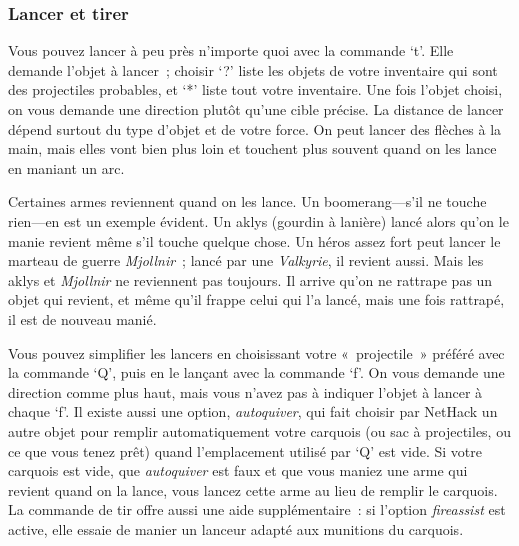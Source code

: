 \documentclass[titlepage]{article}
\begin{document}
\subsubsection{Lancer et tirer}



Vous pouvez lancer à peu près n'importe quoi avec la commande `t'.
Elle demande l'objet à lancer~; choisir `?' liste les objets de votre
inventaire qui sont des projectiles probables, et `*' liste tout
votre inventaire.
Une fois l'objet choisi, on vous demande une direction plutôt qu'une cible
précise.
La distance de lancer dépend surtout du type d'objet et de votre force.
On peut lancer des flèches à la main, mais elles vont bien plus loin et
touchent plus souvent quand on les lance en maniant un arc.


Certaines armes reviennent quand on les lance.
Un boomerang---s'il ne touche rien---en est un exemple évident.
Un aklys (gourdin à lanière) lancé alors qu'on le manie revient même s'il
touche quelque chose.
Un héros assez fort peut lancer le marteau de guerre \textit{Mjollnir}~;
lancé par une \textit{Valkyrie}, il revient aussi.
Mais les aklys et \textit{Mjollnir} ne reviennent pas toujours.
Il arrive qu'on ne rattrape pas un objet qui revient, et même qu'il
frappe celui qui l'a lancé, mais une fois rattrapé, il est de nouveau
manié.


Vous pouvez simplifier les lancers en choisissant votre «~projectile~»
préféré avec la commande `Q', puis en le lançant avec la commande
`f'.
On vous demande une direction comme plus haut, mais vous n'avez pas à
indiquer l'objet à lancer à chaque `f'.
Il existe aussi une option,
\textit{autoquiver},
qui fait choisir par NetHack un autre objet pour remplir automatiquement
votre carquois (ou sac à projectiles, ou ce que vous tenez prêt) quand
l'emplacement utilisé par `Q' est vide.
Si votre carquois est vide, que
\textit{autoquiver}
est faux et que vous maniez une arme qui revient quand on la lance, vous
lancez cette arme au lieu de remplir le carquois.
La commande de tir offre aussi une aide supplémentaire~: si l'option
\textit{fireassist}
est active, elle essaie de manier un lanceur adapté aux munitions du
carquois.
\end{document}

